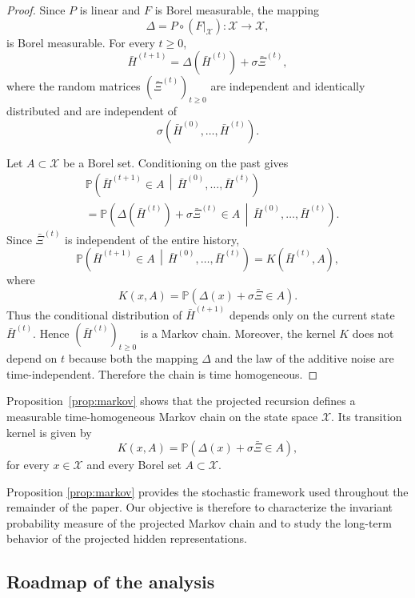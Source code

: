 \documentclass{article}
\begin{document}
\begin{proof}
	
	Since $P$ is linear and $F$ is Borel measurable,
	the mapping
	\[
\Delta=P\circ (F|_{\mathcal X}):\mathcal X\to\mathcal X,
	\]
	is Borel measurable.
	For every $t\ge0$,	
	\[
	\bar H^{(t+1)}
	=
	\Delta(\bar H^{(t)})
	+
	\sigma\bar\Xi^{(t)},
	\]
	where the random matrices
	$(\bar\Xi^{(t)})_{t\ge0}$
	are independent and identically distributed and are independent of	
	\[
	\sigma\!\left(
	\bar H^{(0)},
	\ldots,
	\bar H^{(t)}
	\right).
	\]
	
	Let
	$A\subset\mathcal X$
	be a Borel set.
	Conditioning on the past gives	
	\[
	\begin{aligned}
		&
		\mathbb P
		\!\left(
		\bar H^{(t+1)}
		\in A
		\,\middle|\,
		\bar H^{(0)},
		\ldots,
		\bar H^{(t)}
		\right)
		\\
		&=
		\mathbb P
		\!\left(
		\Delta(\bar H^{(t)})
		+
		\sigma\bar\Xi^{(t)}
		\in A
		\,\middle|\,
		\bar H^{(0)},
		\ldots,
		\bar H^{(t)}
		\right).
	\end{aligned}
	\]
	Since
	$\bar\Xi^{(t)}$
	is independent of the entire history,
	\[
	\mathbb P
	\!\left(
	\bar H^{(t+1)}
	\in A
	\,\middle|\,
	\bar H^{(0)},
	\ldots,
	\bar H^{(t)}
	\right)
	=
	K(\bar H^{(t)},A),
	\]
	where	
	\[
	K(x,A)
	=
	\mathbb P
	\!\left(
	\Delta(x)
	+
	\sigma\bar\Xi
	\in A
	\right).
	\]
	Thus the conditional distribution of
	$\bar H^{(t+1)}$
	depends only on the current state
	$\bar H^{(t)}$.
	Hence
	$(\bar H^{(t)})_{t\ge0}$
	is a Markov chain.
	Moreover, the kernel $K$ does not depend on $t$ because both the mapping
	$\Delta$
	and the law of the additive noise are time-independent.
	Therefore the chain is time homogeneous.	
\end{proof}


Proposition~\ref{prop:markov} shows that the projected recursion defines
a measurable time-homogeneous Markov chain on the state space
$\mathcal X$.
Its transition kernel is given by
\[
K(x,A)
=
\mathbb P
\left(
\Delta(x)+\sigma\bar\Xi\in A
\right),
\]
for every $x\in\mathcal X$ and every Borel set
$A\subset\mathcal X$.


Proposition \ref{prop:markov} provides the stochastic framework used throughout the remainder of the paper.
Our objective is therefore to characterize the invariant probability
measure of the projected Markov chain and to study the long-term
behavior of the projected hidden representations.


\subsection{Roadmap of the analysis}
\end{document}
